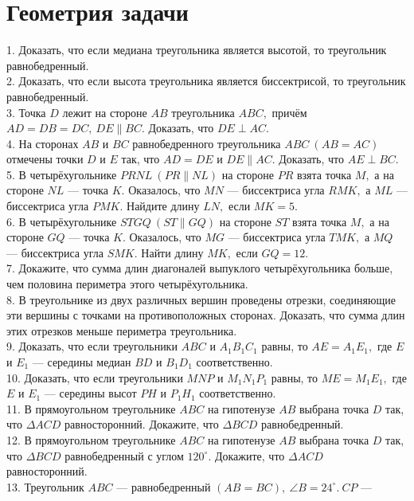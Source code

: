 \section{Геометрия задачи}
1. Доказать, что если медиана треугольника является высотой, то треугольник равнобедренный.\\
2. Доказать, что если высота треугольника является биссектрисой, то треугольник равнобедренный.\\
3. Точка $D$ лежит на стороне $AB$ треугольника $ABC,$ причём $AD=DB=DC,\ DE\parallel BC.$ Доказать, что $DE\perp AC.$\\
4. На сторонах $AB$ и $BC$ равнобедренного треугольника $ABC\ (AB=AC)$ отмечены точки $D$ и $E$ так, что $AD=DE$ и $DE\parallel AC.$ Доказать, что $AE\perp BC.$\\
5. В четырёхугольнике $PRNL\ (PR\parallel NL)$ на стороне $PR$ взята точка $M,$ а на стороне $NL$ --- точка $K.$ Оказалось, что $MN$ --- биссектриса угла $RMK,$ а $ML$ --- биссектриса угла $PMK.$ Найдите длину $LN,$ если $MK=5.$\\
6. В четырёхугольнике $STGQ\ (ST\parallel GQ)$ на стороне $ST$ взята точка $M,$ а на стороне $GQ$ --- точка $K.$ Оказалось, что $MG$ --- биссектриса угла $TMK,$ а $MQ$ --- биссектриса угла $SMK.$ Найти длину $MK,$ если $GQ=12.$\\
7. Докажите, что сумма длин диагоналей выпуклого четырёхугольника больше, чем половина периметра этого четырёхугольника.\\
8. В треугольнике из двух различных вершин проведены отрезки, соединяющие эти вершины с точками на противоположных сторонах. Доказать, что сумма длин этих отрезков меньше периметра треугольника.\\
9. Доказать, что если треугольники $ABC$ и $A_1B_1C_1$ равны, то $AE=A_1E_1,$ где $E$ и $E_1$ --- середины медиан $BD$ и $B_1D_1$ соответственно.\\
10. Доказать, что если треугольники $MNP$ и $M_1N_1P_1$ равны, то $ME=M_1E_1,$ где $E$ и $E_1$ --- середины высот $PH$ и $P_1H_1$ соответственно.\\
11. В прямоугольном треугольнике $ABC$ на гипотенузе $AB$ выбрана точка $D$ так, что
$\Delta ACD$ равносторонний. Докажите, что $\Delta BCD$ равнобедренный.\\
12. В прямоугольном треугольнике $ABC$ на гипотенузе $AB$ выбрана точка $D$ так, что
$\Delta BCD$ равнобедренный с углом $120^\circ.$ Докажите, что $\Delta ACD$ равносторонний.\\
13. Треугольник $ABC$ --- равнобедренный $(AB=BC),\ \angle B=24^\circ.\ CP$ ---
